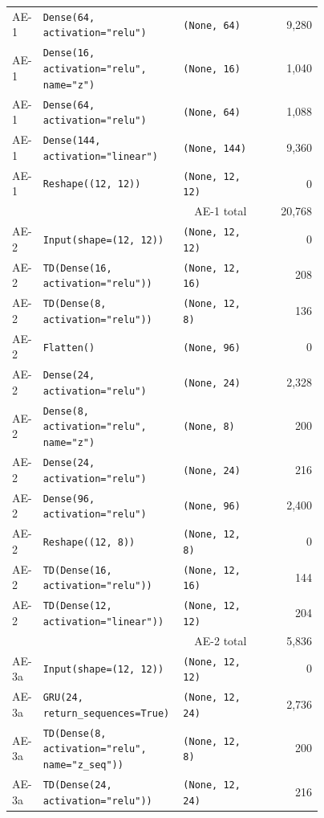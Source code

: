 \begin{longtable}{@{}p{0.08\linewidth}p{0.45\linewidth}p{0.24\linewidth}r@{}}
  AE-1 & \texttt{Dense(64, activation="relu")} & \texttt{(None, 64)} & 9,280 \\
  AE-1 & \texttt{Dense(16, activation="relu", name="z")} & \texttt{(None, 16)} & 1,040 \\
  AE-1 & \texttt{Dense(64, activation="relu")} & \texttt{(None, 64)} & 1,088 \\
  AE-1 & \texttt{Dense(144, activation="linear")} & \texttt{(None, 144)} & 9,360 \\
  AE-1 & \texttt{Reshape((12, 12))} & \texttt{(None, 12, 12)} & 0 \\
  \multicolumn{3}{r}{AE-1 total} & 20,768 \\
  \midrule
  AE-2 & \texttt{Input(shape=(12, 12))} & \texttt{(None, 12, 12)} & 0 \\
  AE-2 & \texttt{TD(Dense(16, activation="relu"))} & \texttt{(None, 12, 16)} & 208 \\
  AE-2 & \texttt{TD(Dense(8, activation="relu"))} & \texttt{(None, 12, 8)} & 136 \\
  AE-2 & \texttt{Flatten()} & \texttt{(None, 96)} & 0 \\
  AE-2 & \texttt{Dense(24, activation="relu")} & \texttt{(None, 24)} & 2,328 \\
  AE-2 & \texttt{Dense(8, activation="relu", name="z")} & \texttt{(None, 8)} & 200 \\
  AE-2 & \texttt{Dense(24, activation="relu")} & \texttt{(None, 24)} & 216 \\
  AE-2 & \texttt{Dense(96, activation="relu")} & \texttt{(None, 96)} & 2,400 \\
  AE-2 & \texttt{Reshape((12, 8))} & \texttt{(None, 12, 8)} & 0 \\
  AE-2 & \texttt{TD(Dense(16, activation="relu"))} & \texttt{(None, 12, 16)} & 144 \\
  AE-2 & \texttt{TD(Dense(12, activation="linear"))} & \texttt{(None, 12, 12)} & 204 \\
  \multicolumn{3}{r}{AE-2 total} & 5,836 \\
  \midrule
  AE-3a & \texttt{Input(shape=(12, 12))} & \texttt{(None, 12, 12)} & 0 \\
  AE-3a & \texttt{GRU(24, return\_sequences=True)} & \texttt{(None, 12, 24)} & 2,736 \\
  AE-3a & \texttt{TD(Dense(8, activation="relu", name="z\_seq"))} & \texttt{(None, 12, 8)} & 200 \\
  AE-3a & \texttt{TD(Dense(24, activation="relu"))} & \texttt{(None, 12, 24)} & 216 \\

\end{longtable}
